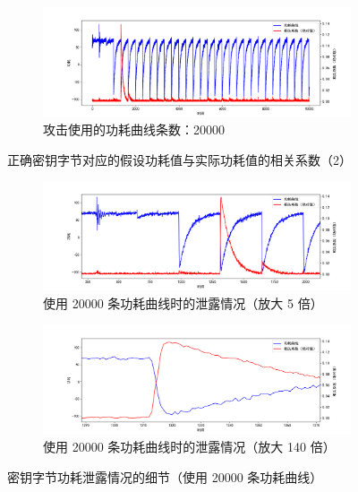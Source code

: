 \begin{figure}[htbp]
\begin{subfigure}{1.0\textwidth}
        \includegraphics[height=.21\textheight, width=1.0\textwidth]{../images/leakage_20000.png}
        \caption{攻击使用的功耗曲线条数：20000}
    \end{subfigure}

    \caption{正确密钥字节对应的假设功耗值与实际功耗值的相关系数（2）}
\end{figure}

\begin{figure}[htbp]
    \centering
    \begin{subfigure}{1.0\textwidth}
        \includegraphics[height=.25\textheight, width=1.0\textwidth]{../images/leakage_20000_zoom_1.png}
        \caption{使用 20000 条功耗曲线时的泄露情况（放大 5 倍）}
    \end{subfigure}
    \begin{subfigure}{1.0\textwidth}
        \includegraphics[height=.25\textheight, width=1.0\textwidth]{../images/leakage_20000_zoom_2.png}
        \caption{使用 20000 条功耗曲线时的泄露情况（放大 140 倍）}
    \end{subfigure}

    \caption{密钥字节功耗泄露情况的细节（使用 20000 条功耗曲线）}
    \label{fig:leakage_zoom}
\end{figure}


